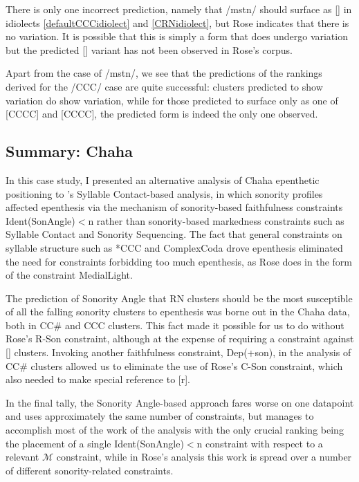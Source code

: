 \documentclass[12pt]{article}
\begin{document}
There is only one incorrect prediction, namely that /mstn/ should surface as [] in idiolects \ref{defaultCCCidiolect} and \ref{CRNidiolect}, but Rose indicates that there is no variation. It is possible that this is simply a form that does undergo variation but the predicted [] variant has not been observed in Rose's corpus.

Apart from the case of /mstn/, we see that the predictions of the rankings derived for the /CCC/ case are quite successful: clusters predicted to show variation do show variation, while for those predicted to surface only as one of [CCCC] and [CCCC], the predicted form is indeed the only one observed.

\subsection{Summary: Chaha}

In this case study, I presented an alternative analysis of Chaha epenthetic positioning to \citet{rose.2000}'s Syllable Contact-based analysis, in which sonority profiles affected epenthesis via the mechanism of sonority-based faithfulness constraints {\sc Ident(SonAngle)}$<$n rather than sonority-based markedness constraints such as Syllable Contact and Sonority Sequencing. The fact that general constraints on syllable structure such as *CCC and {\sc *ComplexCoda} drove epenthesis eliminated the need for constraints forbidding too much epenthesis, as Rose does in the form of the constraint {\sc *MedialLight}.

The prediction of {\sc Sonority Angle} that RN clusters should be the most susceptible of all the falling sonority clusters to epenthesis was borne out in the Chaha data, both in CC\# and CCC clusters. This fact made it possible for us to do without Rose's {\sc *R-Son} constraint, although at the expense of requiring a constraint against [] clusters. Invoking another faithfulness constraint, {\sc Dep}(+son), in the analysis of CC\# clusters allowed us to eliminate the use of Rose's {\sc *C-Son} constraint, which also needed to make special reference to [r].


In the final tally, the {\sc Sonority Angle}-based approach fares worse on one datapoint and uses approximately the same number of constraints, but manages to accomplish most of the work of the analysis with the only crucial ranking being the placement of a single {\sc Ident(SonAngle)}$<$n constraint with respect to a relevant $\mathcal{M}$ constraint, while in Rose's analysis this work is spread over a number of different sonority-related constraints.
\end{document}
